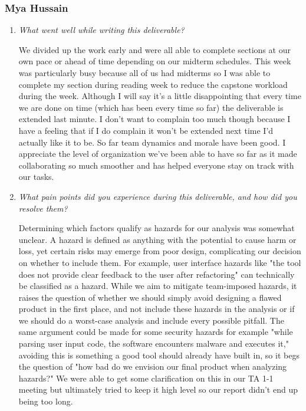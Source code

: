 \documentclass{article}
\newcounter{hazard}
\begin{document}
\subsubsection*{Mya Hussain}

\begin{enumerate}
  \item \textit{What went well while writing this deliverable?}
  
  We divided up the work early and were all able to complete sections at our own 
  pace or ahead of time depending on our midterm schedules. This week was 
  particularly busy because all of us had midterms so I was able to complete 
  my section during reading week to reduce the capstone workload during the week. 
  Although I will say it's a little disappointing that every time we are done on 
  time (which has been every time so far) the deliverable is extended last minute. 
  I don't want to complain too much though because I have a feeling that if I do 
  complain it won't be extended next time I'd actually like it to be. So far team 
  dynamics and morale have been good. I appreciate the level of organization we've 
  been able to have so far as it made collaborating so much smoother and has helped 
  everyone stay on track with our tasks.

  \item \textit{What pain points did you experience during this deliverable, and how did you resolve them?}
  
  Determining which factors qualify as hazards for our analysis was somewhat unclear.
  A hazard is defined as anything with the potential to cause harm or loss, yet certain    
  risks may emerge from poor design, complicating our decision on whether to include them.    
  For example, user interface hazards like "the tool does not provide clear feedback    
  to the user after refactoring" can technically be classified as a hazard. While we    
  aim to mitigate team-imposed hazards, it raises the question of whether we should    
  simply avoid designing a flawed product in the first place, and not include these    
  hazards in the analysis or if we should do a worst-case analysis and include every    
  possible pitfall. The same argument could be made for some security hazards for example    
  "while parsing user input code, the software encounters malware and executes it,"    
  avoiding this is something a good tool should already have built in, so it begs    
  the question of "how bad do we envision our final product when analyzing hazards?"    
  We were able to get some clarification on this in our TA 1-1 meeting but ultimately    
  tried to keep it high level so our report didn't end up being too long.

\end{enumerate}
\end{document}

